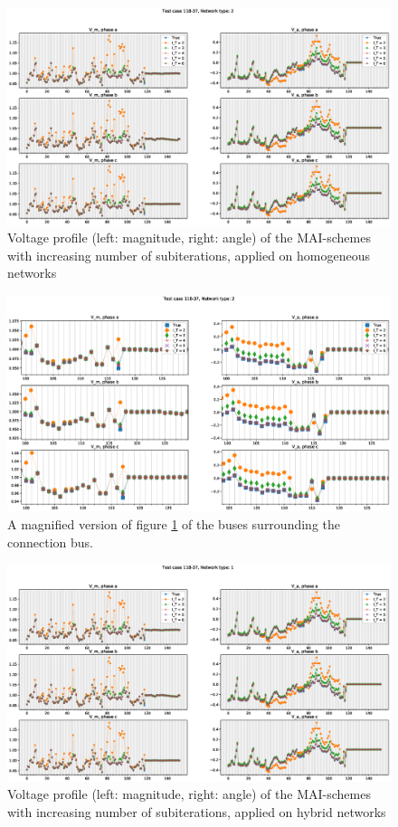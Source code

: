 \documentclass[10pt,journal]{article}
\begin{document}
\begin{figure}[h]
\centering
\includegraphics[width=\textwidth]{Images/MAI_N2.eps}
\caption{Voltage profile (left: magnitude, right: angle) of the MAI-schemes with increasing number of subiterations, applied on homogeneous networks}\label{fig:MAIN2}
\end{figure}
\begin{figure}[h]
\centering
\includegraphics[width=\textwidth]{Images/Z_MAI_N2.eps}
\caption{A magnified version of figure \ref{fig:MAIN2} of the buses surrounding the connection bus.}\label{fig:ZMAIN2}
\end{figure}
\begin{figure}[h]
\centering
\includegraphics[width=\textwidth]{Images/MAI_N1.eps}
\caption{Voltage profile (left: magnitude, right: angle) of the MAI-schemes with increasing number of subiterations, applied on hybrid networks}\label{fig:MAIN1}
\end{figure}
\end{document}
